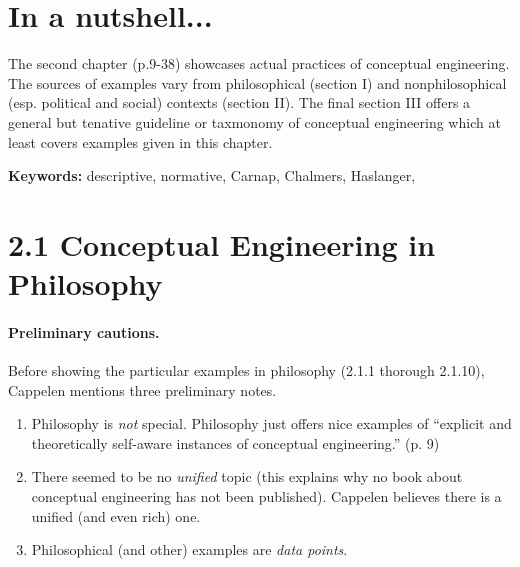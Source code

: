 \documentclass[
10pt, %
a4paper, %
twocolumn, %
landscape %
]{article}
\begin{document}
\pagestyle{myheadings} %
\markright{\doctitle} %


\thispagestyle{plain} %

\printtitle %


\section*{In a nutshell... }
The second chapter (p.9-38) showcases actual practices of conceptual engineering.
The sources of examples vary from philosophical (section I) and nonphilosophical (esp. political and social) contexts (section II).
The final section III offers a general but tenative guideline or taxmonomy of conceptual engineering which at least covers examples given in this chapter.

\noindent \textbf{Keywords:} descriptive, normative, Carnap, Chalmers, Haslanger,

\section*{2.1 Conceptual Engineering in Philosophy}
\paragraph{Preliminary cautions.}
Before showing the particular examples in philosophy (2.1.1 thorough 2.1.10), Cappelen mentions three preliminary notes.

\begin{enumerate}
  \item
    Philosophy is \emph{not} special. Philosophy just offers nice examples of ``explicit and theoretically self-aware instances of conceptual engineering.'' (p. 9)
  \item
    There seemed to be no \emph{unified} topic (this explains why no book about conceptual engineering has not been published). Cappelen believes there is a unified (and even rich) one.
  \item
    Philosophical (and other) examples are \emph{data points}.
\end{enumerate}
\end{document}
